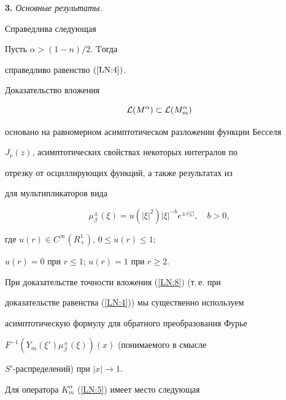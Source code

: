 {\bf 3.} {\it Основные результаты.}


Справедлива следующая





\begin{thm}


Пусть $\alpha>(1-n)/2$. Tогда


справедливо равенство $(\ref{LN:4})$.


\end{thm}





Доказательство вложения


\begin{equation}\label{LN:8}


{\cal L}(M^\alpha) \subset{\cal L}(M_m^\alpha)


\end{equation}


основано на равномерном асимптотическом разложении функции Бесселя


$J_\nu(z)$, асимптотических свойствах некоторых интегралов по


отрезку от осциллирующих функций, а также результатах из \cite{b4}


для мультипликаторов вида


$$


\mu_\beta^\pm(\xi)= u(|\xi|^2) |\xi|^{-b} e^{\pm i|\zeta|},


\quad b>0,


$$


где $u(r)\in C^\infty(R_+^1)$, $0\leqslant u(r)\leqslant 1$;


$u(r)=0$ при $r\leqslant 1$; $u(r)=1$ при $r\geqslant 2$.





При доказательстве точности вложения (\ref{LN:8}) (т.\,е. при


доказательстве равенства (\ref{LN:4})) мы существенно используем


асимптотическую формулу для обратного преобразования Фурье\linebreak


$F^{-1}(Y_m(\xi') \mu_\beta^\pm(\xi))(x)$ (понимаемого в смысле


$S'$-распре\-де\-ле\-ний) при $|x|\to 1$.





Для оператора $K_m^\alpha$ (\ref{LN:5}) имеет место следующая






